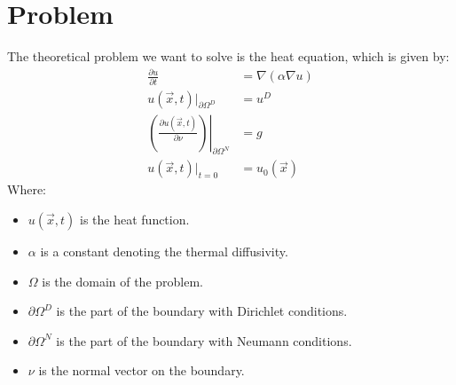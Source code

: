 
\section{\label{sec::problem}Problem}
The theoretical problem we want to solve is the heat equation, which is given by:
\begin{align}
	\frac{\partial u}{\partial t} &= \nabla(\alpha\nabla u) \label{eqn::strongForm}\\
	u(\vec{x},t)|_{\partial\Omega^D} &= u^D\\
	\left.\left( \frac{\partial u(\vec{x},t)}{\partial \nu}\right)\right|_{\partial\Omega^N} &= g\\
	u(\vec{x},t)|_{t=0} &=u_0(\vec{x})
\end{align}
Where:
\begin{itemize}
	\item $u(\vec{x},t)$ is the heat function.
	\item $\alpha$ is a constant denoting the thermal diffusivity.
	\item $\Omega$ is the domain of the problem.
	\item $\partial\Omega^D$ is the part of the boundary with Dirichlet conditions.
	\item $\partial\Omega^N$ is the part of the boundary with Neumann conditions.
	\item $\nu$ is the normal vector on the boundary.
\end{itemize} 